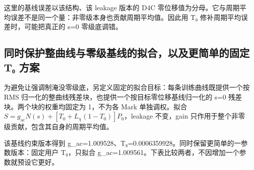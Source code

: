 \documentclass[
  chinese,
  UTF8,
  a4paper,
  11pt]{ctexart}
\begin{document}
这里的基线误差以该结构、该 leakage 版本的 D4C
零位移值为分母。它与周期平均误差不是同一个量：非零级本身也贡献周期平均值。因此用
T₀ 修补周期平均误差时，可能把真正的 s=0 零级底调错。

\subsection{同时保护整曲线与零级基线的拟合，以及更简单的固定 T₀
方案}\label{ux540cux65f6ux4fddux62a4ux6574ux66f2ux7ebfux4e0eux96f6ux7ea7ux57faux7ebfux7684ux62dfux5408ux4ee5ux53caux66f4ux7b80ux5355ux7684ux56faux5b9a-tux2080-ux65b9ux6848}

为避免让强调制淹没零级底，另定义固定的拟合目标：每条训练曲线既提供一个按
RMS 归一化的整曲线残差块，也提供一个按目标零位移基线归一化的 s=0
残差块。两个块的权重均固定为 1，不为各 Mark 单独调权。拟合
\(S=g_{\mathrm{ac}}N(s)+[T_0+L_\chi(1-T_0)]P_0\)，leakage 不变，gain
只作用于整个非零级贡献，包含其自身的周期平均值。

该基线约束版本得到
g\_ac=1.009528、T₀=0.0006359928。同时保留更简单的一参数版本：固定用户
T₀，只拟合 g\_ac=1.009561。下表比较两者，不因增加一个参数就预设它更好。
\end{document}
